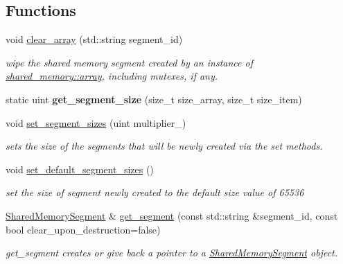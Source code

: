 \subsection*{Functions}
\begin{DoxyCompactItemize}
\item 
void \hyperlink{namespaceshared__memory_a0371eb6089f446098adf2f9c106333dc}{clear\+\_\+array} (std\+::string segment\+\_\+id)
\begin{DoxyCompactList}\small\item\em wipe the shared memory segment created by an instance of \hyperlink{classshared__memory_1_1array}{shared\+\_\+memory\+::array}, including mutexes, if any. \end{DoxyCompactList}\item 
\mbox{\label{namespaceshared__memory_a62e06d817f0f52addc9970db9f83e15d}} 
static uint {\bfseries get\+\_\+segment\+\_\+size} (size\+\_\+t size\+\_\+array, size\+\_\+t size\+\_\+item)
\item 
void \hyperlink{namespaceshared__memory_ac8ef94dc78f444092f488f0143b155f2}{set\+\_\+segment\+\_\+sizes} (uint multiplier\+\_)
\begin{DoxyCompactList}\small\item\em sets the size of the segments that will be newly created via the set methods. \end{DoxyCompactList}\item 
\mbox{\label{namespaceshared__memory_a841687861fcc9efe381ffbe84843ca33}} 
void \hyperlink{namespaceshared__memory_a841687861fcc9efe381ffbe84843ca33}{set\+\_\+default\+\_\+segment\+\_\+sizes} ()
\begin{DoxyCompactList}\small\item\em set the size of segment newly created to the default size value of 65536 \end{DoxyCompactList}\item 
\hyperlink{classshared__memory_1_1SharedMemorySegment}{Shared\+Memory\+Segment} \& \hyperlink{namespaceshared__memory_a7c76ec22ab70d3b7487becd3ec9943bc}{get\+\_\+segment} (const std\+::string \&segment\+\_\+id, const bool clear\+\_\+upon\+\_\+destruction=false)
\begin{DoxyCompactList}\small\item\em get\+\_\+segment creates or give back a pointer to a \hyperlink{classshared__memory_1_1SharedMemorySegment}{Shared\+Memory\+Segment} object. \end{DoxyCompactList}\item 

\end{DoxyCompactItemize}
